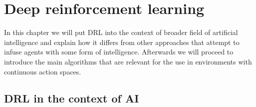 \chapter{Deep reinforcement learning}
In this chapter we will put \ac{DRL} into the context of broader field of artificial intelligence and explain how it differs from other approaches that attempt to infuse agents with some form of intelligence. Afterwards we will proceed to introduce the main algorithms that are relevant for the use in environments with continuous action spaces.  
\section{DRL in the context of AI}
